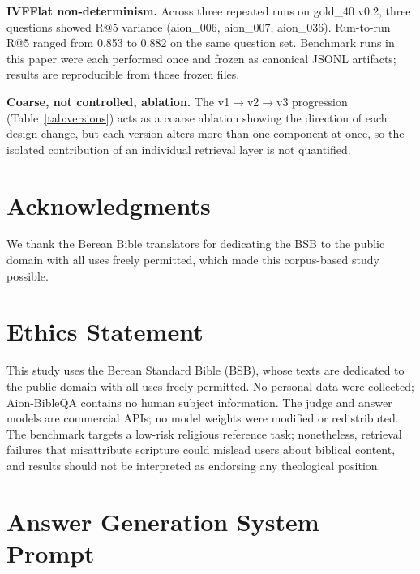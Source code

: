 \documentclass[11pt]{article}
\begin{document}
\textbf{IVFFlat non-determinism.} Across three repeated runs on gold\_40 v0.2, three questions showed R@5 variance (aion\_006, aion\_007, aion\_036). Run-to-run R@5 ranged from 0.853 to 0.882 on the same question set. Benchmark runs in this paper were each performed once and frozen as canonical JSONL artifacts; results are reproducible from those frozen files.

\textbf{Coarse, not controlled, ablation.} The v1$\to$v2$\to$v3 progression (Table~\ref{tab:versions}) acts as a coarse ablation showing the direction of each design change, but each version alters more than one component at once, so the isolated contribution of an individual retrieval layer is not quantified.

\section*{Acknowledgments}

We thank the Berean Bible translators for dedicating the BSB to the public domain with all uses freely permitted, which made this corpus-based study possible.

\section*{Ethics Statement}

This study uses the Berean Standard Bible (BSB), whose texts are dedicated to the public domain with all uses freely permitted.
No personal data were collected; Aion-BibleQA contains no human subject information.
The judge and answer models are commercial APIs; no model weights were modified or redistributed.
The benchmark targets a low-risk religious reference task; nonetheless, retrieval failures that misattribute scripture could mislead users about biblical content, and results should not be interpreted as endorsing any theological position.



\appendix

\section{Answer Generation System Prompt}
\label{app:prompt}
\end{document}
